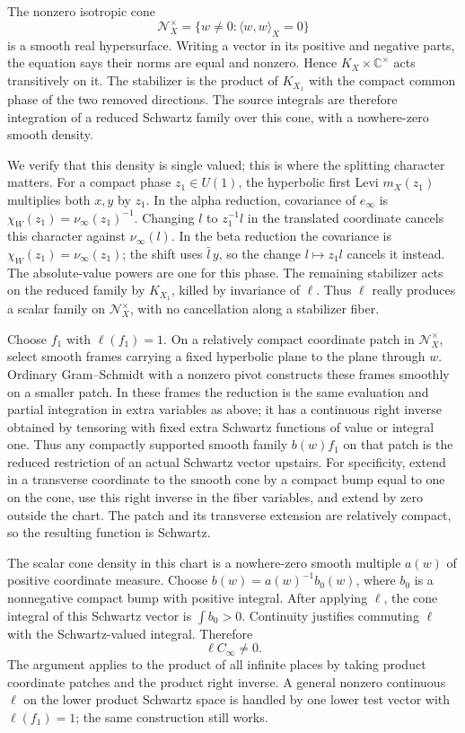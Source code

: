 The nonzero isotropic cone
\[
          \mathcal N_X^\times
                =\{w\ne0:\langle w,w\rangle_X=0\}
\]
is a smooth real hypersurface. Writing a vector in
its positive and negative parts, the equation says
their norms are equal and nonzero. Hence
\(K_X\times\mathbb C^\times\) acts transitively on it.
The stabilizer is the product of \(K_{X_1}\) with
the compact common phase of the two removed directions.
The source integrals are therefore integration of a
reduced Schwartz family over this cone, with a
nowhere-zero smooth density.

We verify that this density is single valued; this is
where the splitting character matters. For a compact
phase \(z_1\in U(1)\), the hyperbolic first Levi
\(m_X(z_1)\) multiplies both \(x,y\) by \(z_1\).
In the alpha reduction, covariance of \(e_\infty\)
is \(\chi_W(z_1)=\nu_\infty(z_1)^{-1}\).
Changing \(l\) to \(z_1^{-1}l\) in the translated
coordinate cancels this character against \(\nu_\infty(l)\).
In the beta reduction the covariance is
\(\chi_W(z_1)=\nu_\infty(z_1)\); the shift uses
\(\bar l\,y\), so the change \(l\mapsto z_1 l\)
cancels it instead. The absolute-value powers are
one for this phase. The remaining stabilizer acts on
the reduced family by \(K_{X_1}\), killed by invariance
of \(\ell\). Thus \(\ell\) really produces a scalar
family on \(\mathcal N_X^\times\), with no cancellation
along a stabilizer fiber.

Choose \(f_1\) with \(\ell(f_1)=1\).
On a relatively compact coordinate patch in
\(\mathcal N_X^\times\), select smooth frames carrying
a fixed hyperbolic plane to the plane through \(w\).
Ordinary Gram--Schmidt with a nonzero pivot constructs
these frames smoothly on a smaller patch.
In these frames the reduction is the same evaluation
and partial integration in extra variables as above;
it has a continuous right inverse obtained by tensoring
with fixed extra Schwartz functions of value or integral
one. Thus any compactly supported smooth family
\(b(w)f_1\) on that patch is the reduced restriction
of an actual Schwartz vector upstairs.
For specificity, extend in a transverse coordinate
to the smooth cone by a compact bump equal to one
on the cone, use this right inverse in the fiber
variables, and extend by zero outside the chart.
The patch and its transverse extension are relatively
compact, so the resulting function is Schwartz.

The scalar cone density in this chart is a nowhere-zero
smooth multiple \(a(w)\) of positive coordinate measure.
Choose \(b(w)=a(w)^{-1}b_0(w)\), where \(b_0\) is a
nonnegative compact bump with positive integral.
After applying \(\ell\), the cone integral of this
Schwartz vector is \(\int b_0>0\).
Continuity justifies commuting \(\ell\) with the
Schwartz-valued integral. Therefore
\[
                               \ell C_\infty\ne0 .
\]
The argument applies to the product of all infinite
places by taking product coordinate patches and the
product right inverse. A general nonzero continuous
\(\ell\) on the lower product Schwartz space is
handled by one lower test vector with \(\ell(f_1)=1\);
the same construction still works.

